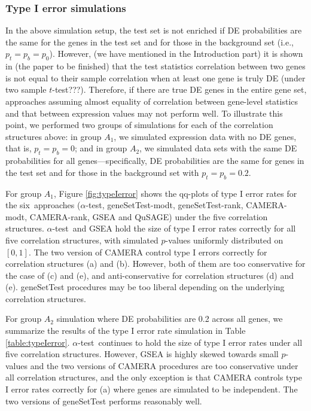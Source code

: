 \documentclass[useAMS,usenatbib, galley]{biom}
\newcommand{\OurMethod}{$\alpha$-test}
\newcommand{\HowmanyTest}{six}
\newcommand{\aaCase}{a}
\newcommand{\aCase}{b}
\newcommand{\cCase}{c}
\newcommand{\eCase}{d}
\newcommand{\fCase}{e}
\begin{document}
	
	\subsubsection{Type I error simulations}
	
	In the above simulation setup, the test set is not enriched if DE probabilities are the same for the genes in the test set and for those in the background set (i.e., $p_t = p_b = p_0$). However, (we have mentioned in the Introduction part) it is shown in (the paper to be finished) that the test statistics correlation between two genes is not equal to their sample correlation when at least one gene is truly DE (under two sample $t$-test???). Therefore, if there are true DE genes in the entire gene set, approaches assuming almost equality of correlation between gene-level statistics and that between expression values may not perform well. To illustrate this point, we performed two groups of simulations for each of the correlation structures above: in group $A_1$, we simulated expression data with no DE genes, that is, $p_t = p_b = 0$; and in group $A_2$, we simulated data sets with the same DE probabilities for all genes---specifically, DE probabilities are the same for genes in the test set and for those in the background set with $p_t= p_b = 0.2$. 
	
	For group $A_1$, Figure \ref{fig:typeIerror} shows the qq-plots of type I error rates for the \HowmanyTest~approaches (\OurMethod, geneSetTest-modt, geneSetTest-rank, CAMERA-modt, CAMERA-rank, GSEA and QuSAGE) under the five correlation structures. \OurMethod~and GSEA hold the size of type I error rates correctly for all five correlation structures, with simulated $p$-values uniformly distributed on $[0, 1]$. The two version of CAMERA control type I errors correctly for correlation structures (\aaCase) and (\aCase). However, both of them are too conservative for the case of (\cCase) and (\fCase), and anti-conservative for correlation structures (\eCase) and (\fCase). geneSetTest procedures may be too liberal depending on the underlying correlation structures. 
	
	For group $A_2$ simulation where DE probabilities are 0.2 across all genes, we summarize the results of the type I error rate simulation in Table \ref{table:typeIerror}. \OurMethod~continues to hold the size of type I error rates under all five correlation structures. However, GSEA is highly skewed towards small $p$-values and the two versions of CAMERA procedures are too conservative under all correlation structures, and the only exception is that CAMERA controls type I error rates correctly for (\aaCase) where genes are simulated to be independent. The two versions of geneSetTest performs reasonably well.
	
\end{document}
